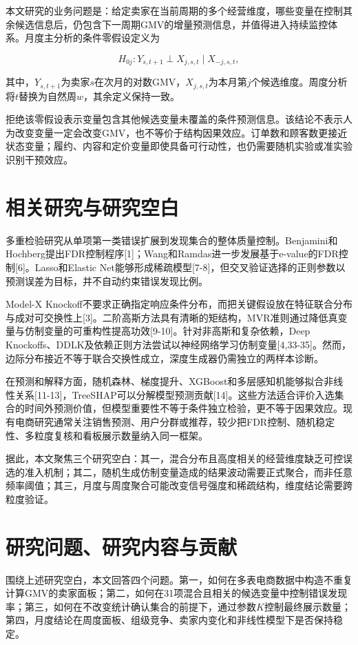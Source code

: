\documentclass{sufethesismas}
\begin{document}
本文研究的业务问题是：给定卖家在当前周期的多个经营维度，哪些变量在控制其余候选信息后，仍包含下一周期GMV的增量预测信息，并值得进入持续监控体系。月度主分析的条件零假设定义为

\[
H_{0j}:Y_{s,t+1}\perp X_{j,s,t}\mid X_{-j,s,t},
\]

其中，\(Y_{s,t+1}\)为卖家\(s\)在次月的对数GMV，\(X_{j,s,t}\)为本月第\(j\)个候选维度。周度分析将\(t\)替换为自然周\(w\)，其余定义保持一致。

拒绝该零假设表示变量包含其他候选变量未覆盖的条件预测信息。该结论不表示人为改变变量一定会改变GMV，也不等价于结构因果效应。订单数和顾客数更接近状态变量；履约、内容和定价变量即使具备可行动性，也仍需要随机实验或准实验识别干预效应。

\section{相关研究与研究空白}

多重检验研究从单项第一类错误扩展到发现集合的整体质量控制。Benjamini和Hochberg提出FDR控制程序{[}1{]}；Wang和Ramdas进一步发展基于e-value的FDR控制{[}6{]}。Lasso和Elastic Net能够形成稀疏模型{[}7-8{]}，但交叉验证选择的正则参数以预测误差为目标，并不自动约束错误发现比例。

Model-X Knockoff不要求正确指定响应条件分布，而把关键假设放在特征联合分布与成对可交换性上{[}3{]}。二阶高斯方法具有清晰的矩结构，MVR准则通过降低真变量与仿制变量的可重构性提高功效{[}9-10{]}。针对非高斯和复杂依赖，Deep Knockoffs、DDLK及依赖正则方法尝试以神经网络学习仿制变量{[}4,33-35{]}。然而，边际分布接近不等于联合交换性成立，深度生成器仍需独立的两样本诊断。

在预测和解释方面，随机森林、梯度提升、XGBoost和多层感知机能够拟合非线性关系{[}11-13{]}，TreeSHAP可以分解模型预测贡献{[}14{]}。这些方法适合评价入选集合的时间外预测价值，但模型重要性不等于条件独立检验，更不等于因果效应。现有电商研究通常关注销售预测、用户分群或推荐，较少把FDR控制、随机稳定性、多粒度复核和看板展示数量纳入同一框架。

据此，本文聚焦三个研究空白：其一，混合分布且高度相关的经营维度缺乏可控误选的准入机制；其二，随机生成仿制变量造成的结果波动需要正式聚合，而非任意频率阈值；其三，月度与周度聚合可能改变信号强度和稀疏结构，维度结论需要跨粒度验证。

\section{研究问题、研究内容与贡献}

围绕上述研究空白，本文回答四个问题。第一，如何在多表电商数据中构造不重复计算GMV的卖家面板；第二，如何在31项混合且相关的候选变量中控制错误发现率；第三，如何在不改变统计确认集合的前提下，通过参数\(K\)控制最终展示数量；第四，月度结论在周度面板、组级竞争、卖家内变化和非线性模型下是否保持稳定。
\end{document}
